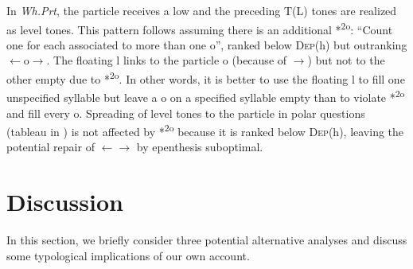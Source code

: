 \documentclass[output=paper,newtxmath,modfonts,nonflat,hidelinks]{langsci/langscibook}
\begin{document}
\begin{table}
\setlength{\tabcolsep}{5pt} 
\caption{Default M insertion in the absence of L\%}
\label{tab:gjersoe:particledefault} 
{\fns
{}}
\end{table}

\clearpage

\setlength{\tabcolsep}{6pt} %

In \textit{Wh.Prt}, the particle receives a low  and the preceding T(L) tones are realized as level tones.
This pattern follows assuming there is an additional  *\textrho\textsuperscript{2o}: ``Count one {\viol} for each  associated to more than one o'', ranked below \textsc{Dep}(h) but outranking \texttau$\leftarrow$o$\to$\textrho.
The floating l links to the particle o (because of \textsigma$\to$\textrho) but not to the other empty  due to *\textrho\textsuperscript{2o}.
In other words, it is better to use the floating l to fill one unspecified syllable but leave a o on a specified syllable empty than to violate *\textrho\textsuperscript{2o} and fill every o.
Spreading of level tones to the particle in polar questions (tableau in ) is not affected by *\textrho\textsuperscript{2o} because it is ranked below \textsc{Dep}(h), leaving the potential repair of \texttau$\leftarrow$\textsigma$\to$\textrho{} by epenthesis suboptimal.



\section{Discussion}\label{sec:gjersoe:4}

In this section, we briefly consider three potential alternative analyses and discuss some typological implications of our own account.
\end{document}
